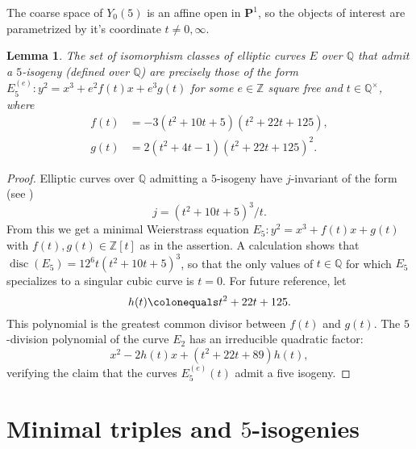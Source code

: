 \documentclass[12pt]{amsart}
\newcounter{counter}[section] %
\numberwithin{equation}{section} %
\newtheorem{lemma}[counter]{Lemma}
\theoremstyle{definition} \newtheorem{definition}[counter]{Definition}
\theoremstyle{remark} \newtheorem{nonexam}[counter]{Non-example}
\newcommand{\ZZ}{\mathbb{Z}} %
\newcommand{\QQ}{\mathbb{Q}} %
\newcommand{\Pone}{\mathbf{P}^1} %
\newcommand{\unit}{^{\times}} %
\DeclareMathOperator{\disc}{disc} %
\begin{document}
The coarse space of $Y_0(5)$ is an affine open in $\Pone$, so the objects of
interest are parametrized by it's coordinate $t \neq 0, \infty$.
\begin{lemma} \label{lemma:X0(5)-parametrization} The set of isomorphism
  classes of elliptic curves $E$ over $\QQ$ that admit a $5$-isogeny (defined
  over $\QQ$) are precisely those of the form
  $E_5^{(e)}\colon y^2 = x^3 + e^2f(t)x + e^3g(t)$ for some $e \in \ZZ$ square
  free and $t\in \QQ\unit$, where
    \begin{align}
    \label{eq:f}
        f(t) &= -3(t^2 + 10t + 5)(t^2 + 22t + 125), \\
    \label{eq:g}
        g(t) &= 2(t^2 + 4t - 1)(t^2 + 22t + 125)^2.
    \end{align}
\end{lemma}
\begin{proof}
  Elliptic curves over $\QQ$ admitting a $5$-isogeny have $j$-invariant of the
  form (see \cite[Page 1247]{halberstadt21})
    \begin{equation}
        \label{eq:j}
        j = (t^2 + 10t + 5)^3 / t.
    \end{equation}
    From this we get a minimal Weierstrass equation
    $E_5\colon y^2 = x^3 + f(t)x + g(t)$ with $f(t), g(t) \in \ZZ[t]$ as in the
    assertion. A calculation shows that $\disc(E_5) = 12^6t(t^2 + 10t +5)^3$,
    so that the only values of $t\in \QQ$ for which $E_5$ specializes to a
    singular cubic curve is $t=0$. For future reference, let
    \begin{equation}
        \label{eq:h}
        h(t) \colonequals t^2 + 22t + 125.
    \end{equation}
    This polynomial is the greatest common divisor between $f(t)$ and $g(t)$.
    The $5$-division polynomial of the curve $E_2$ has an irreducible quadratic
    factor:
    \begin{equation}
        x^2 -2h(t)x +(t^2 + 22t + 89)h(t),
    \end{equation}
    verifying the claim that the curves $E_5^{(e)}(t)$ admit a five isogeny.
\end{proof}



\section{Minimal triples and $5$-isogenies}
\label{sec:triples-and-5isog}
\end{document}
